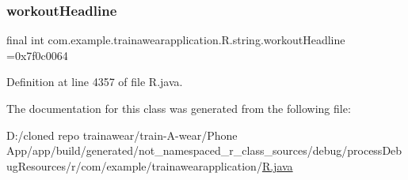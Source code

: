 \mbox{\label{classcom_1_1example_1_1trainawearapplication_1_1_r_1_1string_abf8bce5fc2a7b055f6d5404aa451d626}} 
\subsubsection{\texorpdfstring{workoutHeadline}{workoutHeadline}}
{\footnotesize\ttfamily final int com.\+example.\+trainawearapplication.\+R.\+string.\+workout\+Headline =0x7f0c0064\hspace{0.3cm}{\ttfamily [static]}}



Definition at line 4357 of file R.\+java.



The documentation for this class was generated from the following file\+:\begin{DoxyCompactItemize}
\item 
D\+:/cloned repo trainawear/train-\/\+A-\/wear/\+Phone App/app/build/generated/not\+\_\+namespaced\+\_\+r\+\_\+class\+\_\+sources/debug/process\+Debug\+Resources/r/com/example/trainawearapplication/\mbox{\hyperlink{process_debug_resources_2r_2com_2example_2trainawearapplication_2_r_8java}{R.\+java}}\end{DoxyCompactItemize}
